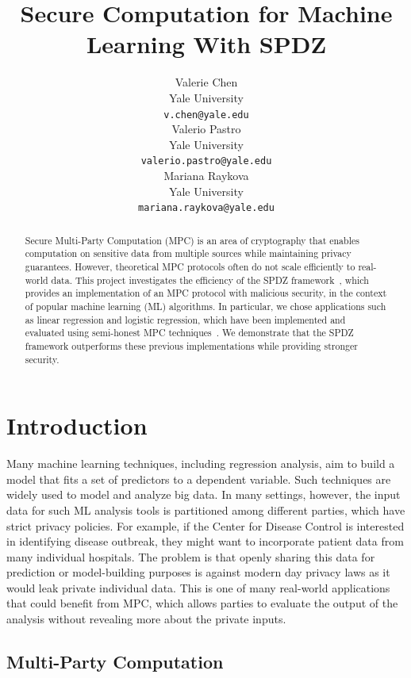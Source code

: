 \documentclass{article}
\title{Secure Computation for Machine Learning With SPDZ}
\author{
  Valerie Chen\\
  Yale University\\
  \texttt{v.chen@yale.edu} \\
  \And
  Valerio Pastro\\
  Yale University\\
  \texttt{valerio.pastro@yale.edu}\\
  \And
  Mariana Raykova \\
  Yale University \\
  \texttt{mariana.raykova@yale.edu} \\
}
\begin{document}
\maketitle

\begin{abstract}
Secure Multi-Party Computation (MPC) is an area of cryptography that enables computation on sensitive data from multiple sources while maintaining privacy guarantees.
However, theoretical MPC protocols often do not scale efficiently to real-world data. This project investigates the efficiency of the SPDZ framework~\cite{SPDZ12}, which provides an implementation
of an MPC protocol with malicious security, in the context of popular machine learning (ML) algorithms. In particular, we chose applications such as linear regression and logistic regression,
which have been implemented and evaluated using semi-honest MPC techniques~\cite{GSB0DZE17, MZ17}. We demonstrate that the SPDZ framework outperforms these previous implementations while providing stronger security.
\end{abstract}


\section{Introduction}

Many machine learning techniques, including regression analysis, aim to build a model that fits a set of predictors to a dependent variable. Such techniques are widely used to model and analyze big data.
In many settings, however, the input data for such ML analysis tools is partitioned among different parties, which have strict privacy policies. For example, if the Center for Disease Control is interested in identifying disease outbreak, they might want to incorporate patient data from many individual hospitals. The problem is that openly sharing this data for prediction or model-building purposes is against modern day privacy laws as it would leak private individual data. This is one of many real-world applications that could benefit from MPC, which allows parties to evaluate the output of the analysis without revealing more about the private inputs.

\subsection{Multi-Party Computation}
\end{document}
